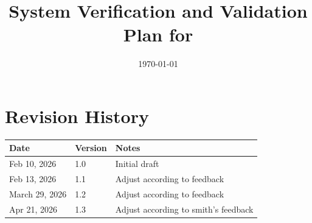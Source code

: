 \documentclass[12pt, titlepage]{article}
\begin{document}
\title{System Verification and Validation Plan for \progname{}} 
\author{\authname}
\date{\today}
	
\maketitle


\section*{Revision History}

\begin{tabularx}{\textwidth}{p{3cm}p{2cm}X}
\toprule {\bf Date} & {\bf Version} & {\bf Notes}\\
\midrule
Feb 10, 2026 & 1.0 & Initial draft\\
Feb 13, 2026 & 1.1 & Adjust according to feedback\\
March 29, 2026 & 1.2 & Adjust according to feedback\\
Apr 21, 2026 & 1.3 & Adjust according to smith's feedback\\
\bottomrule
\end{tabularx}

~\\


\newpage

\tableofcontents


\end{document}
